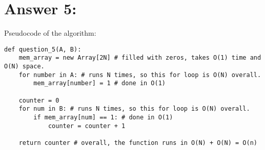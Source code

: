 \documentclass{article}
\begin{document}
\section{Answer 5:}
Pseudocode of the algorithm:
\begin{verbatim}
def question_5(A, B):
    mem_array = new Array[2N] # filled with zeros, takes O(1) time and O(N) space.
    for number in A: # runs N times, so this for loop is O(N) overall.
        mem_array[number] = 1 # done in O(1)

    counter = 0
    for num in B: # runs N times, so this for loop is O(N) overall.
        if mem_array[num] == 1: # done in O(1)
            counter = counter + 1

    return counter # overall, the function runs in O(N) + O(N) = O(n)
        
\end{verbatim}
\end{document}
